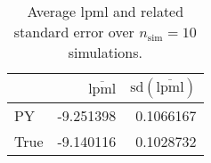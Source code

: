 \begin{table}[H]

\caption{Average lpml and related standard error over $n_{\text{sim}} = 10$ simulations.}
\centering
\begin{tabular}[t]{lrr}
\toprule
  & $\overbar{\text{lpml}}$ & $\text{sd}(\overbar{\text{lpml}})$\\
\midrule
PY & -9.251398 & 0.1066167\\
True & -9.140116 & 0.1028732\\
\bottomrule
\end{tabular}
\end{table}